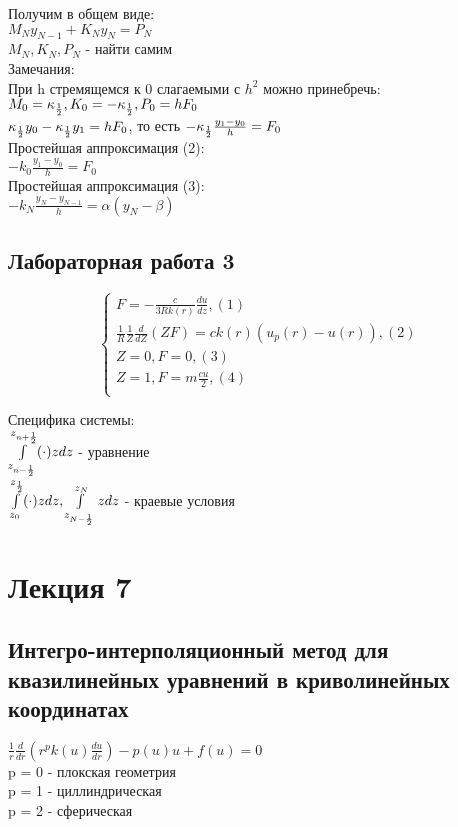 Получим в общем виде:\\
$M_N y_{N - 1} + K_N y_N = P_N$\\
$M_N, K_N, P_N$ - найти самим\\

Замечания:\\
При h стремящемся к 0 слагаемыми с $h^2$ можно принебречь:\\
$M_0 = \kappa_{\frac{1}{2}}, K_0 = -\kappa_{\frac{1}{2}}, P_0 = hF_0$\\
$\kappa_{\frac{1}{2}} y_0 - \kappa_{\frac{1}{2}} y_1 = hF_0$, то есть $-\kappa_{\frac{1}{2}} \frac{y_1 - y_0}{h} = F_0$\\

Простейшая аппроксимация (2):\\
$-k_0 \frac{y_1 - y_0}{h} = F_0$\\

Простейшая аппроксимация (3):\\
$-k_N \frac{y_N - y_{N-1}}{h} = \alpha(y_N - \beta)$\\

\section{Лабораторная работа 3}
\begin{equation}
\begin{cases}
F = -\frac{c}{3Rk(r)} \frac{du}{dz}, (1)\\
\frac{1}{R} \frac{1}{Z} \frac{d}{dZ} (ZF) = c k (r) (u_{p}(r) - u(r)), (2)\\
Z = 0, F = 0, (3)\\
Z = 1, F = m \frac{cu}{2}, (4)\\
\end{cases}
\end{equation}

Специфика системы:\\
$\int\limits_{z_{n-\frac{1}{2}}}^{z_{n+\frac{1}{2}}}(\cdot)zdz$ - уравнение\\
$\int\limits_{z_0}^{z_{\frac{1}{2}}}(\cdot)zdz, \int\limits_{z_{N-\frac{1}{2}}}^{z_N}zdz$ - краевые условия\\

\chapter{Лекция 7}
\section{Интегро-интерполяционный метод для квазилинейных уравнений в криволинейных координатах}
$\frac{1}{r} \frac{d}{dr} (r^{p}k(u)\frac{du}{dr}) - p(u)u + f(u) = 0$\\
p = 0 - плокская геометрия\\
p = 1 - циллиндрическая\\
p = 2 - сферическая\\

